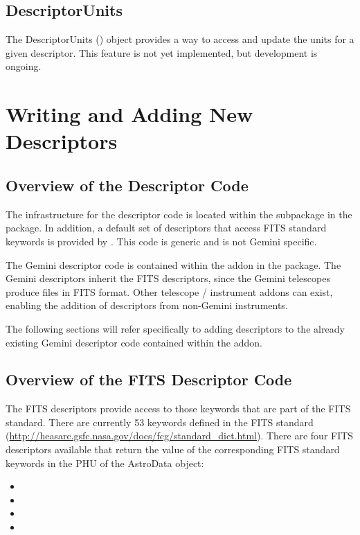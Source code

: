\documentclass[letterpaper,10pt,english]{sphinxmanual}
\begin{document}
\section{DescriptorUnits}
\label{advancedusage:descriptorunits}
The DescriptorUnits () object provides a way to access and update the
units for a given descriptor. This feature is not yet implemented, but
development is ongoing.


\chapter{Writing and Adding New Descriptors}
\label{coding:writing-and-adding-new-descriptors}\label{coding:writing-adding}\label{coding::doc}

\section{Overview of the Descriptor Code}
\label{coding:overview-of-the-descriptor-code}
The infrastructure for the descriptor code is located within the 
subpackage in the  package. In addition, a default set of
descriptors that access FITS standard keywords is provided by .
This code is generic and is not Gemini specific.

The Gemini descriptor code is contained within the  addon
in the  package. The Gemini descriptors inherit the FITS
descriptors, since the Gemini telescopes produce files in FITS format. Other
telescope / instrument addons can exist, enabling the addition of descriptors
from non-Gemini instruments.

The following sections will refer specifically to adding descriptors to the
already existing Gemini descriptor code contained within the
 addon.


\section{Overview of the FITS Descriptor Code}
\label{coding:overview-of-the-fits-descriptor-code}
The FITS descriptors provide access to those keywords that are part of the FITS
standard. There are currently 53 keywords defined in the FITS standard
(\href{http://heasarc.gsfc.nasa.gov/docs/fcg/standard\_dict.html}{http://heasarc.gsfc.nasa.gov/docs/fcg/standard\_dict.html}). There are four FITS
descriptors available that return the value of the corresponding FITS standard
keywords in the PHU of the AstroData object:
\begin{itemize}
\item {} 

\item {} 

\item {} 

\item {} 

\end{itemize}
\end{document}
